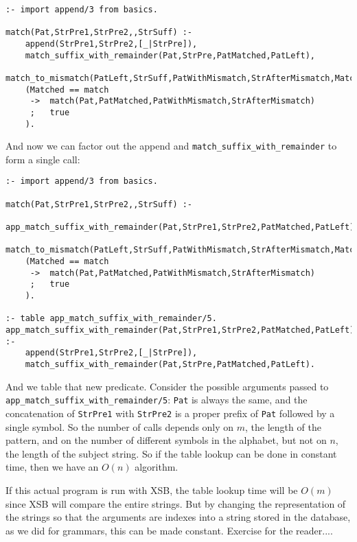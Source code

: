 \begin{verbatim}
:- import append/3 from basics.

match(Pat,StrPre1,StrPre2,,StrSuff) :-
    append(StrPre1,StrPre2,[_|StrPre]),
    match_suffix_with_remainder(Pat,StrPre,PatMatched,PatLeft),
    match_to_mismatch(PatLeft,StrSuff,PatWithMismatch,StrAfterMismatch,Matched),
    (Matched == match
     ->  match(Pat,PatMatched,PatWithMismatch,StrAfterMismatch)
     ;   true
    ).
\end{verbatim}

And now we can factor out the append and \verb|match_suffix_with_remainder|
to form a single call:

\begin{verbatim}
:- import append/3 from basics.

match(Pat,StrPre1,StrPre2,,StrSuff) :-
    app_match_suffix_with_remainder(Pat,StrPre1,StrPre2,PatMatched,PatLeft),
    match_to_mismatch(PatLeft,StrSuff,PatWithMismatch,StrAfterMismatch,Matched),
    (Matched == match
     ->  match(Pat,PatMatched,PatWithMismatch,StrAfterMismatch)
     ;   true
    ).

:- table app_match_suffix_with_remainder/5.
app_match_suffix_with_remainder(Pat,StrPre1,StrPre2,PatMatched,PatLeft) :-
    append(StrPre1,StrPre2,[_|StrPre]),
    match_suffix_with_remainder(Pat,StrPre,PatMatched,PatLeft).
\end{verbatim}

And we table that new predicate.  Consider the possible arguments
passed to \verb|app_match_suffix_with_remainder/5|: \verb|Pat| is
always the same, and the concatenation of \verb|StrPre1| with
\verb|StrPre2| is a proper prefix of \verb|Pat| followed by a single
symbol.  So the number of calls depends only on $m$, the length of the
pattern, and on the number of different symbols in the alphabet, but
not on $n$, the length of the subject string.  So if the table lookup
can be done in constant time, then we have an $O(n)$ algorithm.

If this actual program is run with XSB, the table lookup time will be
$O(m)$ since XSB will compare the entire strings.  But by changing the
representation of the strings so that the arguments are indexes into a
string stored in the database, as we did for grammars, this can be
made constant.  Exercise for the reader....
